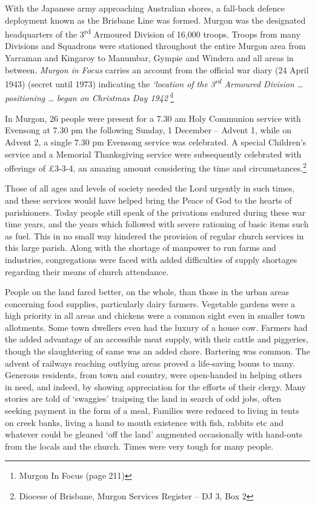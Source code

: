 With the Japanese army approaching Australian shores, a fall-back defence deployment known as the Brisbane Line was formed. Murgon was the designated headquarters of the 3\textsuperscript{rd} Armoured Division of 16,000 troops. Troops from many Divisions and Squadrons were stationed throughout the entire Murgon area from Yarraman and Kingaroy to Manumbar, Gympie and Windera and all areas in between. \emph{Murgon in Focus} carries an account from the official war diary (24 April 1943) (secret until 1973) indicating the \emph{`location of the 3\textsuperscript{rd} Armoured Division \ldots{} positioning \ldots{} began on Christmas Day 1942'}\footnote{Murgon In Focus (page 211)}

In Murgon, 26 people were present for a 7.30 am Holy Communion service with Evensong at 7.30 pm the following Sunday, 1 December -- Advent 1, while on Advent 2, a single 7.30 pm Evensong service was celebrated. A special Children's service and a Memorial Thanksgiving service were subsequently celebrated with offerings of £3-3-4, an amazing amount considering the time and circumstances.\footnote{Diocese of Brisbane, Murgon Services Register -- DJ 3, Box 2}

Those of all ages and levels of society needed the Lord urgently in such times, and these services would have helped bring the Peace of God to the hearts of parishioners. Today people still speak of the privations endured during these war time years, and the years which followed with severe rationing of basic items such as fuel. This in no small way hindered the provision of regular church services in this large parish. Along with the shortage of manpower to run farms and industries, congregations were faced with added difficulties of supply shortages regarding their means of church attendance.

People on the land fared better, on the whole, than those in the urban areas concerning food supplies, particularly dairy farmers. Vegetable gardens were a high priority in all areas and chickens were a common sight even in smaller town allotments. Some town dwellers even had the luxury of a house cow. Farmers had the added advantage of an accessible meat supply, with their cattle and piggeries, though the slaughtering of same was an added chore. Bartering was common. The advent of railways reaching outlying areas proved a life-saving bonus to many. Generous residents, from town and country, were open-handed in helping others in need, and indeed, by showing appreciation for the efforts of their clergy. Many stories are told of `swaggies' traipsing the land in search of odd jobs, often seeking payment in the form of a meal, Families were reduced to living in tents on creek banks, living a hand to mouth existence with fish, rabbits etc and whatever could be gleaned `off the land' augmented occasionally with hand-outs from the locals and the church. Times were very tough for many people.

